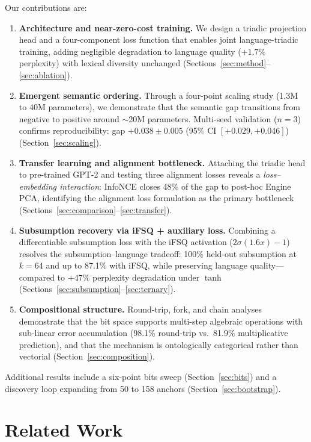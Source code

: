 \documentclass[11pt,a4paper]{article}
\begin{document}
Our contributions are:
\begin{enumerate}
    \item \textbf{Architecture and near-zero-cost training.} We design a triadic projection head and a four-component loss function that enables joint language-triadic training, adding negligible degradation to language quality ($+1.7\%$ perplexity) with lexical diversity unchanged (Sections~\ref{sec:method}--\ref{sec:ablation}).

    \item \textbf{Emergent semantic ordering.} Through a four-point scaling study (1.3M to 40M parameters), we demonstrate that the semantic gap transitions from negative to positive around $\sim$20M parameters. Multi-seed validation ($n=3$) confirms reproducibility: gap $+0.038 \pm 0.005$ (95\% CI $[+0.029, +0.046]$) (Section~\ref{sec:scaling}).

    \item \textbf{Transfer learning and alignment bottleneck.} Attaching the triadic head to pre-trained GPT-2 and testing three alignment losses reveals a \emph{loss--embedding interaction}: InfoNCE closes 48\% of the gap to post-hoc Engine PCA, identifying the alignment loss formulation as the primary bottleneck (Sections~\ref{sec:comparison}--\ref{sec:transfer}).

    \item \textbf{Subsumption recovery via iFSQ + auxiliary loss.} Combining a differentiable subsumption loss with the iFSQ activation ($2\sigma(1.6x)-1$) resolves the subsumption--language tradeoff: 100\% held-out subsumption at $k=64$ and up to 87.1\% with iFSQ, while preserving language quality---compared to $+47\%$ perplexity degradation under $\tanh$ (Sections~\ref{sec:subsumption}--\ref{sec:ternary}).

    \item \textbf{Compositional structure.} Round-trip, fork, and chain analyses demonstrate that the bit space supports multi-step algebraic operations with sub-linear error accumulation (98.1\% round-trip vs.\ 81.9\% multiplicative prediction), and that the mechanism is ontologically categorical rather than vectorial (Section~\ref{sec:composition}).
\end{enumerate}
Additional results include a six-point bits sweep (Section~\ref{sec:bits}) and a discovery loop expanding from 50 to 158 anchors (Section~\ref{sec:bootstrap}).


\section{Related Work}
\label{sec:related}
\end{document}
